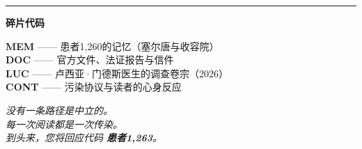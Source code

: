 \vspace{0.8em}

\noindent\rule{\textwidth}{0.5pt}
\vspace{0.6em}

\noindent\textbf{碎片代码}

\vspace{0.3em}
\noindent\textcolor{mem}{\textbf{MEM}} —— 患者1,260的记忆（塞尔唐与收容院）\\[0.25em]
\textcolor{doc}{\textbf{DOC}} —— 官方文件、法证报告与信件\\[0.25em]
\textcolor{luc}{\textbf{LUC}} —— 卢西亚·门德斯医生的调查卷宗（2026）\\[0.25em]
\textcolor{cont}{\textbf{CONT}} —— 污染协议与读者的心身反应

\vspace{1.2em}
\begin{center}\itshape
没有一条路径是中立的。\\[0.2em]
每一次阅读都是一次传染。\\[0.6em]
\upshape 到头来，您将回应代码 \textbf{患者1,263}。
\end{center}

\endgroup
\clearpage
